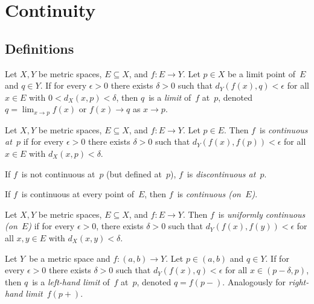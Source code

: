 %
%
%
\section{Continuity}
\subsection*{Definitions}
\begin{defn}
Let \(X,Y\) be metric spaces, \(E\subseteq X\), and \(f:E\to Y\). Let \(p\in X\) be a limit point of~\(E\) and \(q\in Y\). If for every \(\epsilon>0\) there exists \(\delta>0\) such that \(d_Y(f(x),q)<\epsilon\) for all \(x\in E\) with \(0<d_X(x,p)<\delta\), then \(q\)~is a \emph{limit} of~\(f\) at~\(p\), denoted \(q=\lim_{x\to p}f(x)\) or \(f(x)\to q\) as \(x\to p\).
\end{defn}

\begin{defn}
Let \(X,Y\) be metric spaces, \(E\subseteq X\), and \(f:E\to Y\). Let \(p\in E\). Then \(f\)~is \emph{continuous at~\(p\)} if for every \(\epsilon>0\) there exists \(\delta>0\) such that \(d_Y(f(x),f(p))<\epsilon\) for all \(x\in E\) with \(d_X(x,p)<\delta\).

If \(f\)~is not continuous at~\(p\) (but defined at~\(p\)), \(f\)~is \emph{discontinuous at~\(p\)}.

If \(f\)~is continuous at every point of~\(E\), then \(f\)~is \emph{continuous (on~\(E\))}.
\end{defn}

\begin{defn}
Let \(X,Y\) be metric spaces, \(E\subseteq X\), and \(f:E\to Y\). Then \(f\)~is \emph{uniformly continuous (on~\(E\))} if for every \(\epsilon>0\), there exists \(\delta>0\) such that \(d_Y(f(x),f(y))<\epsilon\) for all \(x,y\in E\) with \(d_X(x,y)<\delta\).
\end{defn}

\begin{defn}
Let \(Y\)~be a metric space and \(f:(a,b)\to Y\). Let \(p\in(a,b)\) and \(q\in Y\). If for every \(\epsilon>0\) there exists \(\delta>0\) such that \(d_Y(f(x),q)<\epsilon\) for all \(x\in(p-\delta,p)\), then \(q\)~is a \emph{left-hand limit} of~\(f\) at~\(p\), denoted \(q=f(p-)\). Analogously for \emph{right-hand limit}~\(f(p+)\).
\end{defn}

